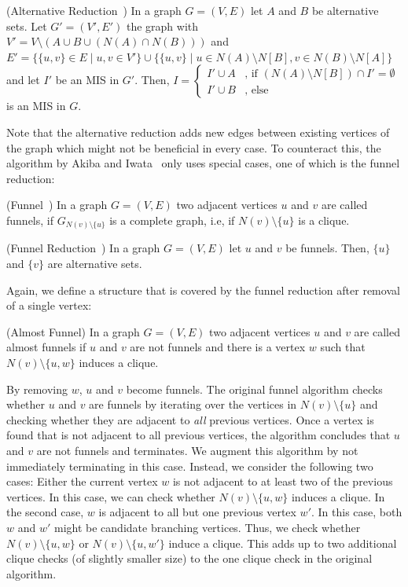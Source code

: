 \documentclass[a4paper,UKenglish,cleveref, autoref, thm-restate]{lipics-v2021}
\begin{document}
\begin{theorem} (Alternative Reduction~\cite{XiaoUnconfined})
	In a graph $G=(V,E)$ let $A$ and $B$ be alternative sets. Let $G'=(V', E')$
    the graph with $V' = V\setminus(A\cup B\cup (N(A)\cap N(B)))$ and $E' =
    \{\{u,v\} \in E \mid u,v \in V'\} \cup \{ \{u,v\}\;|\; u\in
    N(A)\setminus N[B], v\in N(B)\setminus N[A] \}$ and let $I'$ be an MIS in $G'$. Then,
	$
    I=\begin{cases}
      I'\cup A & \text{, if } (N(A)\setminus N[B]) \cap I' = \emptyset%
      \\
      I'\cup B & \text{, else}
	\end{cases}
    $
	is an MIS in $G$.
\end{theorem}

Note that the alternative reduction adds new edges between existing
vertices of the graph which might not be beneficial in every case. To counteract this, the algorithm
by Akiba and Iwata~\cite{AkibaIwata} only uses special cases, one of which is
the funnel reduction:

\begin{definition} (Funnel~\cite{XiaoUnconfined})
	In a graph $G=(V,E)$ two adjacent vertices $u$ and $v$ are called funnels, if $G_{N(v)\setminus\{u\}}$ is a complete graph, i.e, if $N(v)\setminus\{u\}$ is a clique.
\end{definition}
\begin{theorem} (Funnel Reduction~\cite{XiaoUnconfined}) In a graph $G=(V,E)$ let $u$ and $v$ be funnels. Then, $\{u\}$ and $\{v\}$ are alternative sets.	
\end{theorem}

Again, we define a structure that is covered by the funnel reduction after
removal of a single vertex:

\begin{definition}(Almost Funnel)
  In a graph $G=(V,E)$ two adjacent vertices $u$ and $v$ are called almost funnels if $u$ and $v$ are not funnels and there is a vertex $w$ such that $N(v)\setminus\{u,w\}$ induces a clique.
\end{definition}

By removing $w$, $u$ and $v$ become funnels. The original funnel algorithm
checks whether $u$ and $v$ are funnels by iterating over the vertices in $N(v) \setminus \{u\}$
and checking whether they are adjacent to \emph{all} previous vertices. Once a vertex
is found that is not adjacent to all previous vertices, the algorithm concludes
that $u$ and $v$ are not funnels and terminates. We augment this algorithm by
not immediately terminating in this case. Instead, we consider the following two
cases: Either the current vertex $w$ is not adjacent to at least two of the
previous vertices. In this case, we can check whether $N(v) \setminus \{u, w\}$
induces a clique. In the second case, $w$ is adjacent to all but one previous
vertex $w'$. In this case, both $w$ and $w'$ might be candidate branching
vertices. Thus, we check whether $N(v) \setminus \{u, w\}$ or $N(v) \setminus
\{u, w'\}$ induce a clique. This adds up to two additional clique checks (of
slightly smaller size) to the one clique check in the original algorithm.
\end{document}
